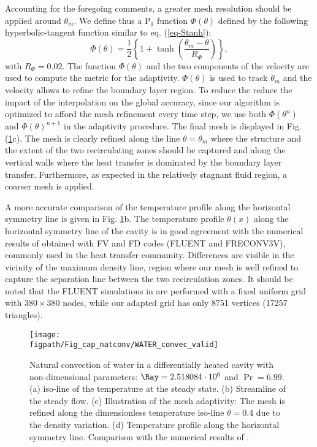 Accounting for the foregoing comments, a greater mesh resolution should be applied around $\theta_m$.
We define thus a P$_1$ function $\Phi(\theta)$ defined by the following hyperbolic-tangent function similar to eq. (\ref{eq-Stanh}):
\begin{equation}
\Phi(\theta) =  \frac{1}{2}\left\{
1 + \tanh\left(\frac{\theta_m-\theta}{R_{\Phi}}\right)
\right\},
\label{eq-Stm}
\end{equation} 
with $R_{\Phi}=0.02$. 
The function $\Phi(\theta)$ and the two components of the velocity are used to compute the metric for the adaptivity.
$\Phi(\theta)$ is used to track $\theta_m$ and the velocity allows to refine the boundary layer region.
To reduce the reduce the impact of the interpolation on the global accuracy, since our algorithm is optimized to afford the mesh refinement every time step, we use both $\Phi(\theta^n)$ and $\Phi(\theta)^{n+1}$ in the adaptivity procedure.
The final mesh is displayed in Fig. (\ref{fig-T1w-isoT}c).
The mesh is clearly refined along the line $\theta = \theta_m$ where  the structure and the extent of the two recirculating zones should be captured and along the vertical walls where the heat transfer is dominated by the boundary layer transfer.
Furthermore, as expected in the relatively stagnant fluid region, a coarser mesh is applied.

A more accurate comparison of the temperature profile along the horizontal symmetry line is given in Fig. \ref{fig-T1w-isoT}b. 
The temperature profile $\theta(x)$ along the horizontal symmetry line of the cavity is in good agreement with the numerical results   of \cite{Kowalewski-2003} obtained with FV and FD codes (FLUENT and FRECONV3V), commonly used in the heat transfer community. Differences are visible in the vicinity of the maximum density line, region where our mesh is well refined to capture the separation line between the two recirculation zones. It should be noted that the FLUENT simulations in \cite{Kowalewski-2003} are performed with a fixed uniform grid with $380\times380$ nodes, while our adapted grid has only 8751 vertices (17257 triangles).

\begin{figure}
	\begin{center}
		\texttt{[image: \\figpath/Fig\_cap\_natconv/WATER\_convec\_valid]}
	\end{center}
	\caption{Natural convection of water in a differentially heated cavity with non-dimensional parameters: $\Ray=2.518084\cdot 10^{6}$ and $\Pr=6.99$. (a) iso-line of the temperature at the steady state. (b) Streamline of the steady flow. (c) Illustration of the mesh adaptivity: The mesh is refined along the dimensionless temperature iso-line $\theta = 0.4$ due to the density variation. (d) Temperature profile along the horizontal symmetry line. Comparison with the numerical results of \cite{Kowalewski-2003}.}
	\label{fig-T1w-isoT} %
\end{figure}

